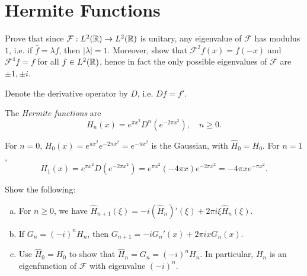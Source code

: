 \section{Hermite Functions}

\begin{exercise}
  Prove that since $\mathcal{F} : L^2(\mathbb{R}) \to L^2(\mathbb{R})$
  is unitary, any eigenvalue of $\mathcal{F}$ has
  modulus $1$, i.e.
  if $\widehat{f} = \lambda f$, then $|\lambda| = 1$.
  Moreover, show that $\mathcal{F}^2 f(x) = f(-x)$
  and $\mathcal{F}^4 f = f$ for all $f \in L^2(\mathbb{R})$,
  hence in fact the only possible eigenvalues
  of $\mathcal{F}$
  are $\pm 1, \pm i$.
\end{exercise}

\begin{remark}
  Denote the derivative operator by $D$, i.e.
  $Df = f'$.
\end{remark}

\begin{definition}
  The \emph{Hermite functions} are
  \[
    H_n(x) = e^{\pi x^2} D^n(e^{-2\pi x^2}), \quad
    n \ge 0.
  \]
\end{definition}

\begin{example}
  For $n = 0$,
  $H_0(x) = e^{\pi x^2} e^{-2\pi x^2} = e^{-\pi x^2}$
  is the Gaussian, with $\widehat{H}_0 = H_0$.
  For $n = 1$,
  \[
    H_1(x) = e^{\pi x^2} D(e^{-2\pi x^2})
    = e^{\pi x^2}(-4\pi x)e^{-2\pi x^2}
    = -4\pi x e^{-\pi x^2}.
  \]
\end{example}

\begin{exercise}
  Show the following:
  \begin{enumerate}[(a)]
    \item For $n \ge 0$,
      we have $\widehat{H}_{n + 1}(\xi) = -i (\widehat{H}_n)'(\xi) + 2\pi i \xi \widehat{H}_n(\xi)$.
    \item If $G_n = (-i)^n H_n$, then
      $G_{n + 1} = -i G_n'(x) + 2\pi i x G_n(x)$.
    \item Use $\widehat{H}_0 = H_0$ to show
      that $\widehat{H}_n = G_n = (-i)^n H_n$.
      In particular, $H_n$ is an eigenfunction of
      $\mathcal{F}$ with eigenvalue $(-i)^n$.
  \end{enumerate}
\end{exercise}

